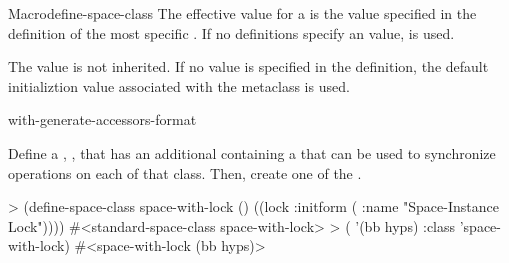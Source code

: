 \documentclass[10pt,twoside,english,pdftex]{article}
\begin{document}
\begin{functiondoc}{Macro}{define-space-class}
The effective  value for a
 is the value specified in the definition of the
most specific . If no definitions specify an
 value, \nil{} is used.

The  value is not inherited.  If
no value is specified in the  definition, the
default initializtion value associated with the metaclass is used.

\begin{alsos}{with-generate-accessors-format}
\end{alsos}

\fnexample 
{}%
Define a ,
, that has an additional 
containing a  that can be used to synchronize
operations on each  of that class. Then, create
one  of the 
.
\begin{example}
> (define-space-class space-with-lock ()
    ((lock :initform ( :name "Space-Instance Lock"))))
#<standard-space-class space-with-lock>
> ( '(bb hyps) 
    :class 'space-with-lock)
#<space-with-lock (bb hyps)>
\end{example}

\end{functiondoc}

\end{document}
